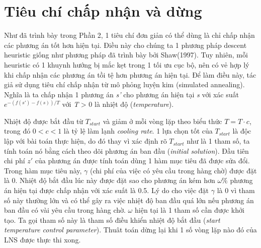 \section{Tiêu chí chấp nhận và dừng}
Như đã trình bày trong Phần 2, 1 tiêu chí đơn giản có thể dùng là chỉ chấp nhận các phương án tốt hơn hiện tại. Điều này cho chúng ta 1 phương pháp descent heuristic giống như phương pháp đã trình bày bởi Shaw(1997). Tuy nhiên, mỗi heuristic có 1 khuynh hướng bị mắc kẹt trong 1 tối ưu cục bộ, nên có vẻ hợp lý khi chấp nhận các phương án tồi tệ hơn phương án hiện tại. Để làm điều này, tác giả sử dụng tiêu chí chấp nhận từ mô phỏng luyện kim (simulated annealing). Nghĩa là ta chấp nhận 1 phương án \textit{s'} cho phương án hiện tại \textit{s} với xác suất $e^{-(f(s')-f(s))/T}$ với \textit{T} > 0 là nhiệt độ (\textit{temperature}).

Nhiệt độ được bắt đầu từ $T_{start}$ và giảm ở mỗi vòng lặp theo biểu thức $T=T \cdot c$, trong đó $0<c<1$ là tỷ lệ làm lạnh \textit{cooling rate}. 1 lựa chọn tốt của $T_{start}$ là độc lập với bài toán thực hiện, do đó thay vì xác định rõ $T_{start}$ như là 1 tham số, ta tính toán nó bằng cách theo dõi phương án ban đầu (\textit{initial solution}). Đầu tiên chi phí $z'$ của phương án được tính toán dùng 1 hàm mục tiêu đã được sửa đổi. Trong hàm mục tiêu này, $\gamma$ (chi phí của việc có yêu cầu trong hàng chờ) được đặt là 0. Nhiệt độ bắt đầu lúc này được đặt sao cho phương án kém hơn $\omega\%$ phương án hiện tại được chấp nhận với xác suất là 0.5. Lý do cho việc đặt $\gamma$ là 0 vì tham số này thường lớn và có thể gây ra việc nhiệt độ ban đầu quá lớn nếu phương án ban đầu có vài yêu cầu trong hàng chờ. $\omega$ hiện tại là 1 tham số cần được khởi tạo. Ta gọi tham số này là tham số điều khiển nhiệt độ bắt đầu (\textit{start temperature control parameter}). Thuât toán dừng lại khi 1 số vòng lặp nào đó của LNS được thực thi xong.
